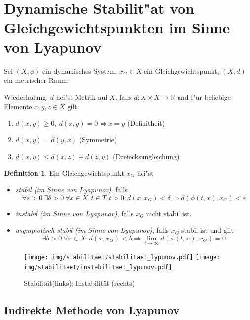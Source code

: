 \documentclass[a4paper, 13pt]{scrreprt}
\theoremstyle{definition} \newtheorem{definition}{Definition}[section]
\begin{document}
\section{Dynamische Stabilit"at von Gleichgewichtspunkten im Sinne von Lyapunov}
Sei $(X, \phi)$ ein dynamisches System, $x_G\in X$ ein Gleichgewichtspunkt, $(X, d)$ ein metrischer Raum.

Wiederholung: $d$ hei"st Metrik auf $X$, falls $d\colon X \times X \to \mathbb{R}$ und f"ur beliebige Elemente $x, y, z\in X$ gilt:
\begin{enumerate}
\item $d(x,y) \geq 0, \ d(x, y) = 0 \Leftrightarrow x = y$ (Definitheit)
\item $d(x,y) = d(y, x)$ (Symmetrie)
\item $d(x, y) \leq d(x,z) + d(z, y) $ (Dreiecksungleichung)
\end{enumerate}

\begin{definition}
Ein Gleichgewichtspunkt $x_G$ hei"st
\begin{itemize}
\item \emph{stabil (im Sinne von Lyapunov)}, falls 
$$ \forall \varepsilon > 0 \ \exists \delta > 0 \ \forall x \in X, t \in T, t > 0: d(x, x_G) < \delta \Rightarrow d\left(\phi(t, x), x_G\right) < \varepsilon$$
\item \emph{instabil (im Sinne von Lyapunov)}, falls $x_G$ nicht stabil ist.
\item \emph{asymptotisch stabil (im Sinne von Lyapunov)}, falls $x_G$ stabil ist und gilt
$$ \exists b > 0\ \forall x \in X: d(x, x_G) < b \Rightarrow \lim_{t\to\infty}{d\left(\phi(t, x), x_G\right)} = 0$$
\end{itemize}
\end{definition}
\begin{figure}[htpb]
\centering
\texttt{[image: img/stabilitaet/stabilitaet\_lypunov.pdf]}
\texttt{[image: img/stabilitaet/instabilitaet\_lypunov.pdf]}
\caption{Stabilität(links); Instabilität (rechts)}
\end{figure}

\subsection{Indirekte Methode von Lyapunov}
\end{document}
